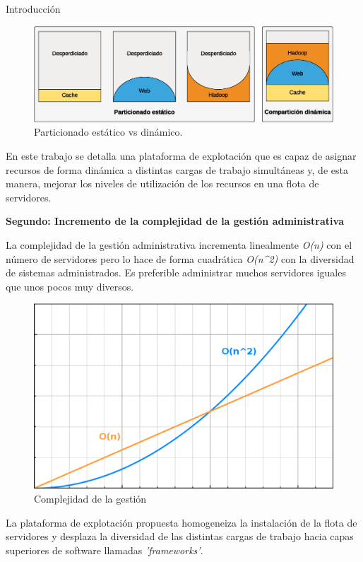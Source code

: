 \documentclass[a4paper,12pt,spanish,final]{epsc_tfc_pfc}
\begin{document}
\begin{intro}{Introducción}
\begin{figure}[h]
  \centering
  \includegraphics[scale=0.55]{static}
    \caption{Particionado estático vs dinámico.}
\end{figure}

En este trabajo se detalla una plataforma de explotación que es capaz de asignar recursos de forma dinámica a distintas cargas de trabajo simultáneas y, de esta manera, mejorar los niveles de utilización de los recursos en una flota de servidores.

\textbf{Segundo: Incremento de la complejidad de la gestión administrativa}

La complejidad de la gestión administrativa incrementa linealmente \emph{O(n)} con el número de servidores pero lo hace de forma cuadrática \emph{O(n\^{}2)} con la diversidad de sistemas administrados. Es preferible administrar muchos servidores iguales que unos pocos muy diversos.

\begin{figure}[h]
  \centering
    \includegraphics[scale=0.30]{complex}
      \caption{Complejidad de la gestión}
\end{figure}

La plataforma de explotación propuesta homogeneiza la instalación de la flota de servidores y desplaza la diversidad de las distintas cargas de trabajo hacia capas superiores de software llamadas \emph{'frameworks'}.


\end{intro}
\end{document}
